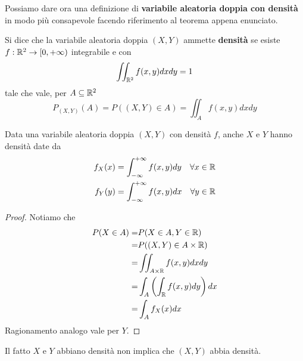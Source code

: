 Possiamo dare ora una definizione di \textbf{variabile aleatoria doppia con densità} in modo più
consapevole facendo riferimento al teorema appena enunciato.

\begin{definition}
	Si dice che la variabile aleatoria doppia $(X,Y)$ ammette \textbf{densità} se esiste
	$f : \mathbb{R}^2 \to [0, +\infty)$ integrabile e con
	\[ \iint_{\mathbb{R}^2} f(x,y) dx dy = 1 \]
	tale che vale, per $A \subseteq \mathbb{R}^2$
	\[ P_{(X,Y)} (A) = P((X,Y) \in A) = \iint_A f(x,y) dx dy \]
\end{definition}

\begin{proposition}
	Data una variabile aleatoria doppia $(X, Y)$ con densità $f$, anche $X$ e $Y$ hanno densità
	date da
	\begin{align*}
		f_X(x) = \int_{-\infty}^{+\infty} f(x,y) dy \quad \forall x \in \mathbb{R} \\
		f_Y(y) = \int_{-\infty}^{+\infty} f(x,y) dx \quad \forall y \in \mathbb{R}
	\end{align*}
	\begin{proof}
		Notiamo che
		\begin{align*}
			P(X \in A) = & P(X \in A, Y \in \mathbb{R})                       \\
			=            & P((X, Y) \in A \times \mathbb{R})                  \\
			=            & \iint_{A \times \mathbb{R}} f(x,y) dx dy           \\
			=            & \int_A \left( \int_{\mathbb{R}} f(x,y) dy \right) dx \\
			=            & \int_A f_X (x) dx
		\end{align*}
		Ragionamento analogo vale per $Y$.
	\end{proof}
\end{proposition}

\begin{observation}
	Il fatto $X$ e $Y$ abbiano densità non implica che $(X,Y)$ abbia densità.
\end{observation}